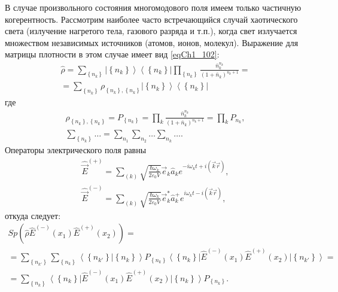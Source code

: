 В случае произвольного состояния многомодового поля имеем только
частичную когерентность. Рассмотрим наиболее часто встречающийся
случай хаотического света (излучение нагретого тела, газового разряда
и т.п.), когда свет излучается множеством независимых источников
(атомов, ионов, молекул). Выражение для матрицы плотности в этом
случае имеет вид \eqref{eqCh1_102}: 
\begin{eqnarray}
\hat{\rho} = 
\sum_{\left\{n_k\right\}} 
 \left|\left\{n_k\right\}\right>\left<\left\{n_k\right\}\right|
\prod_{\left\{n_k\right\}} 
\frac{\bar{n}_k^{n_k}}{\left(1 + \bar{n}_k\right)^{n_k+1}} =
\nonumber \\
= \sum_{\left\{n_k\right\}} \rho_{\left\{n_k\right\},
  \left\{n_k\right\}}
\left|\left\{n_k\right\}\right>\left<\left\{n_k\right\}\right|  
\label{eqCh4_18}
\end{eqnarray}
где
\begin{eqnarray}
\rho_{\left\{n_k\right\},
  \left\{n_k\right\}} =
P_{\left\{n_k\right\}} = 
\prod_k 
\frac{\bar{n}_k^{n_k}}{\left(1 + \bar{n}_k\right)^{n_k+1}} = 
\prod_k P_{n_k},
\nonumber \\
\sum_{\left\{n_k\right\}} \dots = 
\sum_{n_1} \sum_{n_2} \dots \sum_{n_k} \dots. 
\nonumber
\end{eqnarray}
Операторы электрического поля равны
\begin{eqnarray}
\hat{\vec{E}}^{(+)}= \sum_{(k)}\sqrt{\frac{\hbar \omega_k}{2
    \varepsilon_0 V}} \vec{e}_k \hat{a}_k e^{-i \omega_k t + i
    \left(\vec{k} \vec{r}\right)},
\nonumber \\
\hat{\vec{E}}^{(-)}= \sum_{(k)}\sqrt{\frac{\hbar \omega_k}{2
    \varepsilon_0 V}} \vec{e}_k^{*} \hat{a}_k^{+} e^{i \omega_k t - i
    \left(\vec{k} \vec{r}\right)},
\label{eqCh4_19}
\end{eqnarray}
откуда следует:
\begin{eqnarray}
Sp \left(
\hat{\rho}\hat{E}^{(-)}\left(x_1\right)
\hat{E}^{(+)}\left(x_2\right)
\right) = 
\nonumber \\
=\sum_{\left\{n_{k'}\right\}}\sum_{\left\{n_{k}\right\}}
\left<\left\{n_{k'}\right\}\right|\left.\left\{n_{k}\right\}\right>
P_{\left\{n_k\right\}}
\left<\left\{n_{k}\right\}\right|
\hat{E}^{(-)}\left(x_1\right)
\hat{E}^{(+)}\left(x_2\right)
\left|\left\{n_{k'}\right\}\right> =
\nonumber \\
= \sum_{\left\{n_{k}\right\}}
\left<\left\{n_{k}\right\}\right|
\hat{E}^{(-)}\left(x_1\right)
\hat{E}^{(+)}\left(x_2\right)
\left|\left\{n_{k}\right\}\right>
P_{\left\{n_k\right\}}.
\label{eqCh4_20}
\end{eqnarray}
